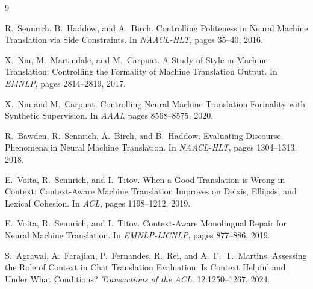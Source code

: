 \documentclass[11pt]{article}
\begin{document}
\begin{thebibliography}{9}
\small

R.~Sennrich, B.~Haddow, and A.~Birch.
\newblock Controlling Politeness in Neural Machine Translation via Side Constraints.
\newblock In \emph{NAACL-HLT}, pages 35--40, 2016.

X.~Niu, M.~Martindale, and M.~Carpuat.
\newblock A Study of Style in Machine Translation: Controlling the Formality of
Machine Translation Output.
\newblock In \emph{EMNLP}, pages 2814--2819, 2017.

X.~Niu and M.~Carpuat.
\newblock Controlling Neural Machine Translation Formality with Synthetic Supervision.
\newblock In \emph{AAAI}, pages 8568--8575, 2020.

R.~Bawden, R.~Sennrich, A.~Birch, and B.~Haddow.
\newblock Evaluating Discourse Phenomena in Neural Machine Translation.
\newblock In \emph{NAACL-HLT}, pages 1304--1313, 2018.

E.~Voita, R.~Sennrich, and I.~Titov.
\newblock When a Good Translation is Wrong in Context: Context-Aware Machine
Translation Improves on Deixis, Ellipsis, and Lexical Cohesion.
\newblock In \emph{ACL}, pages 1198--1212, 2019.

E.~Voita, R.~Sennrich, and I.~Titov.
\newblock Context-Aware Monolingual Repair for Neural Machine Translation.
\newblock In \emph{EMNLP-IJCNLP}, pages 877--886, 2019.

S.~Agrawal, A.~Farajian, P.~Fernandes, R.~Rei, and A.~F.~T.~Martins.
\newblock Assessing the Role of Context in Chat Translation Evaluation: Is Context
Helpful and Under What Conditions?
\newblock \emph{Transactions of the ACL}, 12:1250--1267, 2024.

\end{thebibliography}
\end{document}

